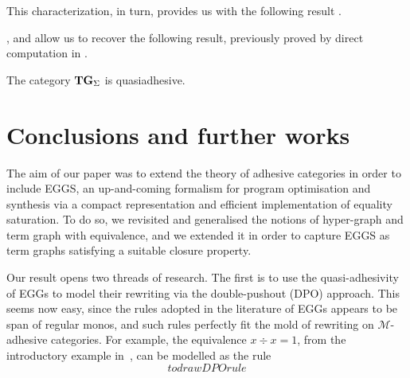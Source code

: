 \documentclass[a4paper,UKenglish,cleveref,pdftex,thm-restate,numberwithinsect]{lipics-v2021}
\newcommand{\catname}[1]{\textbf{\textup{#1}}}
\newcommand{\hyp}{\catname{Hyp}}
\newcommand{\tg}[0]{\catname{TG}_{\Sigma}}
\begin{document}
This characterization, in turn, provides us with the following result \cite{CastelnovoGM24,castelnovo2023thesis}. 



,  and  allow us to recover the following result, previously proved by direct computation in \cite[Thm.~4.2]{CorradiniG05}.
\begin{corollary}
	The category $\tg$ is quasiadhesive.
\end{corollary}










\section{Conclusions and further works}
The aim of our paper was to extend the theory of adhesive categories in order to include EGGS, 
an up-and-coming formalism for program optimisation and synthesis via a compact representation and 
efficient implementation of equality saturation.
%
To do so, we revisited and generalised the notions of hyper-graph and term graph with equivalence, and
we extended it in order to capture EGGS as term graphs satisfying a suitable closure property.

Our result opens two threads of research. The first is to use the quasi-adhesivity of EGGs to
model their rewriting via the double-pushout (DPO) approach. This seems now easy, since 
the rules adopted in the literature of EGGs appears to be span of regular monos, and such rules
perfectly fit the mold of rewriting on $\mathcal{M}$-adhesive categories. 
For example, the equivalence $x \div x = 1$, from the introductory example in~\cite{xxx}, 
can be modelled as the rule
\[to draw DPO rule\]
\end{document}
